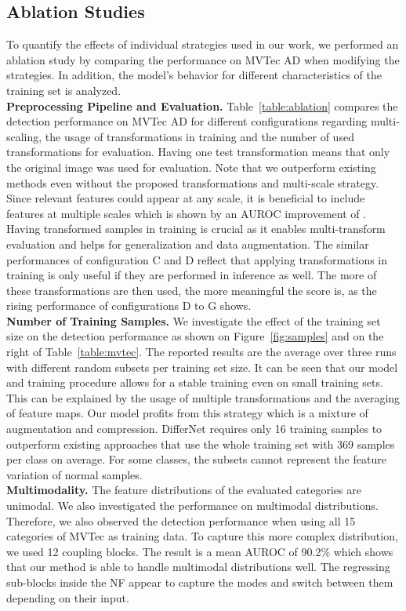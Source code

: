 \documentclass[10pt,twocolumn,letterpaper]{article}
\begin{document}
\subsection{Ablation Studies}
\label{ablation}
To quantify the effects of individual strategies used in our work, we performed an ablation study by comparing the performance on MVTec AD \cite{mvtec} when modifying the strategies. In addition, the model's behavior for different characteristics of the training set is analyzed.\\
\textbf{Preprocessing Pipeline and Evaluation.}
Table~\ref{table:ablation} compares the detection performance on MVTec AD for different configurations regarding multi-scaling, the usage of transformations in training and the number of used transformations  for evaluation.
Having one test transformation means that only the original image was used for evaluation.
Note that we outperform existing methods even without the proposed transformations and multi-scale strategy.
Since relevant features could appear at any scale, it is beneficial to include features at multiple scales which is shown by an AUROC improvement of .
Having transformed samples in training is crucial as it enables multi-transform evaluation and helps for generalization and data augmentation.
The similar performances of configuration C and D reflect that applying transformations in training is only useful if they are performed in inference as well.
The more of these transformations are then used, the more meaningful the score is, as the rising performance of configurations D to G shows.\\
\textbf{Number of Training Samples.}
We investigate the effect of the training set size on the detection performance as shown on Figure~\ref{fig:samples} and on the right of Table~\ref{table:mvtec}. 
The reported results are the average over three runs with different random subsets per training set size.
It can be seen that our model and training procedure allows for a stable training even on small training sets.
This can be explained by the usage of multiple transformations and the averaging of feature maps.
Our model profits from this strategy which is a mixture of augmentation and compression.
DifferNet requires only 16 training samples to outperform existing approaches that use the whole training set with 369 samples per class on average.
For some classes, the subsets cannot represent the feature variation of normal samples.\\
\textbf{Multimodality.}
The feature distributions of the evaluated categories are unimodal.
We also investigated the performance on multimodal distributions. 
Therefore, we also observed the detection performance when using all 15 categories of MVTec as training data.
To capture this more complex distribution, we used 12 coupling blocks.
The result is a mean AUROC of 90.2\% which shows that our method is able to handle multimodal distributions well.
The regressing sub-blocks inside the NF appear to capture the modes and switch between them depending on their input.
\end{document}
